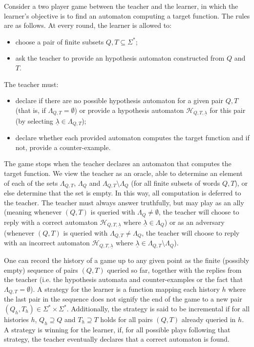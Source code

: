 \documentclass{lmcs}
\numberwithin{theorem}{section}
\begin{document}
Consider a two player game between the teacher and the learner, in which the learner's objective is to find an automaton computing a target function. The rules are as follows. At every round, the learner is allowed to:
\begin{itemize}
\item choose a pair of finite subsets $Q, T \subseteq \Sigma^*$; 
\item ask the teacher to provide an hypothesis automaton constructed from $Q$ and $T$.
\end{itemize}
 The teacher must:
\begin{itemize} 
    \item declare if there are no possible hypothesis automaton for a given pair $Q,T$ (that is, if $\Lambda_{Q,T} = \emptyset$) or provide a hypothesis automaton $\mathcal{H}_{Q, T, \underline{\lambda}}$ for this pair (by selecting $\underline{\lambda} \in \Lambda_{Q, T}$); 
    \item declare whether each provided automaton computes the target function and if not, provide a counter-example.
\end{itemize}\noindent %
The game stops when the teacher declares an automaton that computes the target function.  We view the teacher as an oracle, able to determine an element of each of the sets $\Lambda_{Q, T}$, $\Lambda_{Q}$ and $\Lambda_{Q, T}\setminus\Lambda_{Q}$ (for all finite subsets of words $Q, T$), or else determine that the set is empty. In this way, all computation is deferred to the teacher. The teacher must always answer truthfully, but may play as an ally (meaning whenever $(Q,T)$ is queried with $\Lambda_{Q}\neq \emptyset$, the teacher will choose to reply with a correct automaton $\mathcal{H}_{Q, T, \underline{\lambda}}$ where $\underline{\lambda} \in \Lambda_{Q}$) or as an adversary (whenever $(Q,T)$ is queried with $\Lambda_{Q,T} \neq \Lambda_{Q}$, the teacher will choose to reply with an incorrect automaton $\mathcal{H}_{Q, T, \underline{\lambda}}$ where $\underline{\lambda} \in \Lambda_{Q,T} \setminus \Lambda_{Q}$).

One can record the history of a game up to any given point  as the finite (possibly empty) sequence of pairs $(Q,T)$ queried so far, together with the replies from the teacher (i.e. the hypothesis automata and counter-examples or the fact that $\Lambda_{Q,T} = \emptyset$). A strategy for the learner is a function mapping each history $h$ where the last pair in the sequence does not signify the end of the game to a new pair $(Q_h,T_h) \in \Sigma^* \times \Sigma^*$. Additionally, the strategy is said to be incremental if for all histories $h$, $Q_h \supseteq Q$ and $T_h \supseteq T$ holds for all pairs $(Q,T)$ already queried in $h$.     
A strategy is winning for the learner, if, for all possible plays following that strategy, the teacher eventually declares that a correct automaton is found. 
\end{document}
